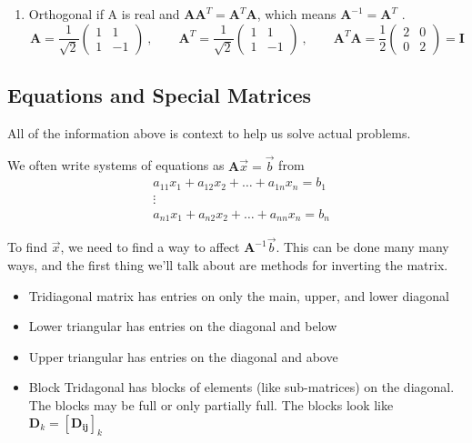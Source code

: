 \documentclass[12pt]{article}
\newcommand{\ve}[1]{\ensuremath{\mathbf{#1}}}
\begin{document}
\begin{enumerate}
\item Orthogonal if A is real and $\ve{AA}^T = \ve{A}^T\ve{A}$, which means $\ve{A}^{-1} = \ve{A}^T$ .
%
\begin{equation}
\ve{A} = \frac{1}{\sqrt{2}}\begin{pmatrix}
   1 & 1 \\
   1 & -1 
\end{pmatrix}\:, \qquad
\ve{A}^T = \frac{1}{\sqrt{2}}\begin{pmatrix}
   1 & 1 \\
   1 & -1 
\end{pmatrix}\:,\qquad
\ve{A}^T\ve{A} = \frac{1}{2}\begin{pmatrix}
   2 & 0 \\
   0 & 2 
\end{pmatrix} = \ve{I} \nonumber
\end{equation}

\end{enumerate}


\subsection*{Equations and Special Matrices}

All of the information above is context to help us solve actual problems. 

We often write systems of equations as $\ve{A}\vec{x} = \vec{b}$ from
\begin{align}
&a_{11} x_1 + a_{12} x_2 + \dots + a_{1n} x_n = b_1 \nonumber \\
&\vdots \nonumber \\
&a_{n1} x_1 + a_{n2} x_2 + \dots + a_{nn} x_n = b_n \nonumber
\end{align}

To find $\vec{x}$, we need to find a way to affect $\ve{A}^{-1}\vec{b}$. This can be done many many ways, and the first thing we'll talk about are methods for inverting the matrix.

\begin{itemize}
\item Tridiagonal matrix has entries on only the main, upper, and lower diagonal
\item Lower triangular has entries on the diagonal and below
\item Upper triangular has entries on the diagonal and above 
\item Block Tridagonal has blocks of elements (like sub-matrices) on the diagonal. The blocks may be full or only partially full. The blocks look like $\ve{D}_k = [\ve{D_{ij}}]_k$
\end{itemize}
\end{document}

